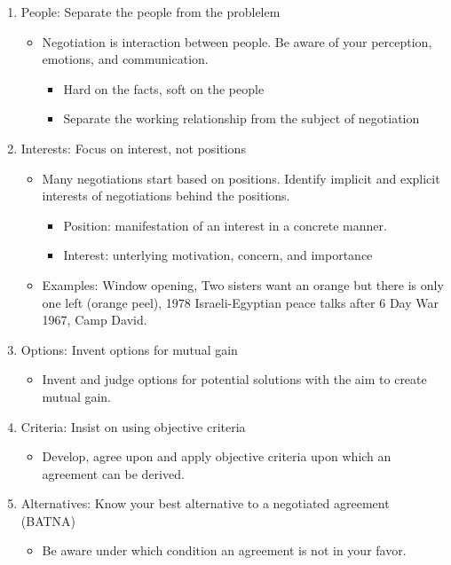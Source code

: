 \begin{enumerate}
    \item People: Separate the people from the problelem
        \begin{itemize}
            \item Negotiation is interaction between people. Be aware of your
                perception, emotions, and communication.
                \begin{itemize}
                    \item Hard on the facts, soft on the people
                    \item Separate the working relationship from the subject of negotiation
                \end{itemize}
        \end{itemize}
    \item Interests: Focus on interest, not positions
        \begin{itemize}
            \item Many negotiations start based on positions. Identify implicit
                and explicit interests of negotiations behind the positions.
                \begin{itemize}
                    \item Position: manifestation of an interest in a concrete manner.
                    \item Interest: unterlying motivation, concern, and importance
                \end{itemize}
            \item Examples: Window opening, Two sisters want an orange but there
                is only one left (orange peel), 1978 Israeli-Egyptian peace talks after
                6 Day War 1967, Camp David.
        \end{itemize}
    \item Options: Invent options for mutual gain
        \begin{itemize}
            \item Invent and judge options for potential solutions with the aim
                to create mutual gain.
        \end{itemize}
    \item Criteria: Insist on using objective criteria
        \begin{itemize}
            \item Develop, agree upon and apply objective criteria upon which an
                agreement can be derived.
        \end{itemize}
    \item Alternatives: Know your best alternative to a negotiated agreement (BATNA)
        \begin{itemize}
            \item Be aware under which condition an agreement is not in your favor.
        \end{itemize}
\end{enumerate}


